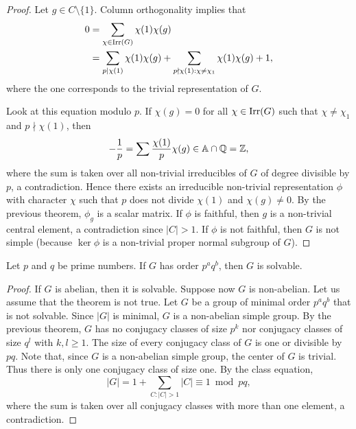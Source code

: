 \begin{proof}
	Let $g\in C\setminus\{1\}$. Column orthogonality implies that 
	\begin{equation}
	\label{eq:Burnside}
	\begin{aligned}
		0&=\sum_{\chi\in\operatorname{Irr}(G)}\chi(1)\chi(g)\\
		&=\sum_{p\mid\chi(1)}\chi(1)\chi(g)+\sum_{p\nmid\chi(1):\chi\ne\chi_1}\chi(1)\chi(g)+1,
	\end{aligned}
	\end{equation}
	where the one corresponds to the trivial representation of
	$G$.
	
	Look at this equation modulo $p$. If $\chi(g)=0$ for all
	$\chi\in\operatorname{Irr}(G)$
	such that $\chi\ne\chi_1$ and $p\nmid\chi(1)$, then
	\[
	-\frac{1}{p}=\sum\frac{\chi(1)}{p}\chi(g)\in\mathbb{A}\cap\mathbb{Q}=\mathbb{Z},
	\]
	where the sum is taken over all non-trivial irreducibles
	of $G$ of degree divisible by $p$, a contradiction. Hence 
	there exists an irreducible non-trivial representation 
	$\phi$ with character $\chi$ such that $p$ does not divide
	$\chi(1)$ and $\chi(g)\ne0$. By the previous theorem, 
	$\phi_g$ is a scalar matrix. If $\phi$ is faithful, then 
	$g$ is a non-trivial central element, a contradiction since 
    $|C|>1$. If $\phi$ is not faithful, then 
    $G$ is not simple (because 
	$\ker\phi$ is a non-trivial proper normal subgroup of $G$). 
\end{proof}

\begin{theorem}[Burnside]
  Let $p$ and $q$ be prime numbers. If $G$ has order $p^aq^b$, then $G$ is solvable.
\end{theorem}

\begin{proof}
	If $G$ is abelian, then it is solvable.
	Suppose now $G$ is non-abelian.
	Let us assume that the theorem is not true. Let $G$ be a group
	of minimal order $p^aq^b$
	that is not solvable. Since $|G|$ is minimal, $G$ is a non-abelian simple group.
	By the previous theorem, 
	$G$ has no conjugacy classes of size $p^k$ nor 
	conjugacy classes of size $q^l$ with $k,l\geq1$. The size
	of every conjugacy class of $G$ is one or divisible by $pq$. 
	Note that, since $G$ is a non-abelian simple group,
	the center of $G$ is trivial.
	Thus there is only one conjugacy class of size one.
	By the class
	equation,
	\[
		|G|=1+\sum_{C:|C|>1}|C|\equiv 1 \bmod pq,
	\]
	where the sum is taken over all conjugacy classes 
	with more than one element, a contradiction.
\end{proof}

